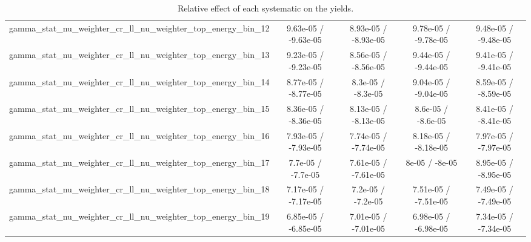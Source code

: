 \documentclass[10pt]{article}
\begin{document}
\begin{table}[htbp]
\begin{center}
\begin{tabular}{|c|c|c|c|c|}
  gamma_stat_nu_weighter_cr_ll_nu_weighter_top_energy_bin_12 & 9.63e-05 / -9.63e-05 & 8.93e-05 / -8.93e-05 & 9.78e-05 / -9.78e-05 & 9.48e-05 / -9.48e-05 \\ 
  gamma_stat_nu_weighter_cr_ll_nu_weighter_top_energy_bin_13 & 9.23e-05 / -9.23e-05 & 8.56e-05 / -8.56e-05 & 9.44e-05 / -9.44e-05 & 9.41e-05 / -9.41e-05 \\ 
  gamma_stat_nu_weighter_cr_ll_nu_weighter_top_energy_bin_14 & 8.77e-05 / -8.77e-05 & 8.3e-05 / -8.3e-05 & 9.04e-05 / -9.04e-05 & 8.59e-05 / -8.59e-05 \\ 
  gamma_stat_nu_weighter_cr_ll_nu_weighter_top_energy_bin_15 & 8.36e-05 / -8.36e-05 & 8.13e-05 / -8.13e-05 & 8.6e-05 / -8.6e-05 & 8.41e-05 / -8.41e-05 \\ 
  gamma_stat_nu_weighter_cr_ll_nu_weighter_top_energy_bin_16 & 7.93e-05 / -7.93e-05 & 7.74e-05 / -7.74e-05 & 8.18e-05 / -8.18e-05 & 7.97e-05 / -7.97e-05 \\ 
  gamma_stat_nu_weighter_cr_ll_nu_weighter_top_energy_bin_17 & 7.7e-05 / -7.7e-05 & 7.61e-05 / -7.61e-05 & 8e-05 / -8e-05 & 8.95e-05 / -8.95e-05 \\ 
  gamma_stat_nu_weighter_cr_ll_nu_weighter_top_energy_bin_18 & 7.17e-05 / -7.17e-05 & 7.2e-05 / -7.2e-05 & 7.51e-05 / -7.51e-05 & 7.49e-05 / -7.49e-05 \\ 
  gamma_stat_nu_weighter_cr_ll_nu_weighter_top_energy_bin_19 & 6.85e-05 / -6.85e-05 & 7.01e-05 / -7.01e-05 & 6.98e-05 / -6.98e-05 & 7.34e-05 / -7.34e-05 \\ 
\hline 
\end{tabular} 
\caption{Relative effect of each systematic on the yields.} 
\end{center} 
\end{table} 
\end{document}
